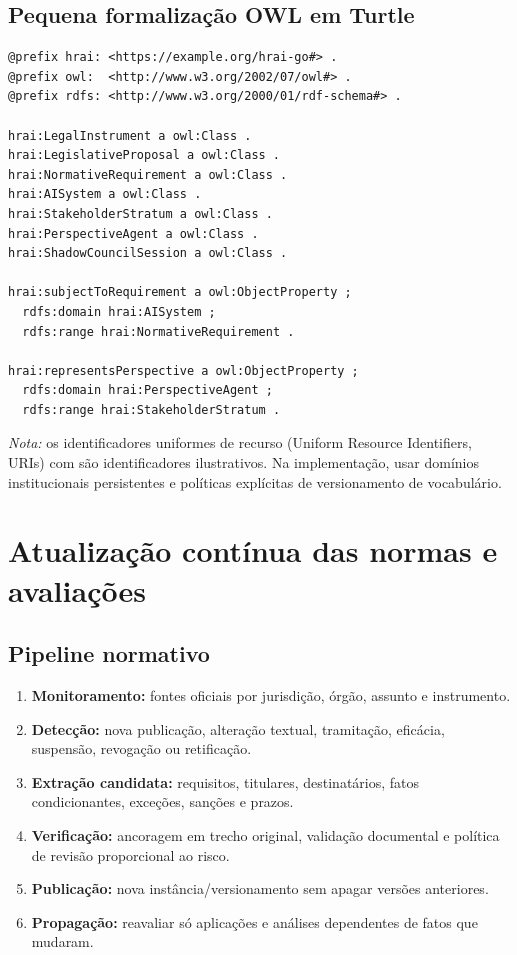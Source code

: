 \documentclass[12pt,a4paper,oneside,english,brazil]{abntex2}
\newcommand{\term}[1]{{\mdseries\ttfamily\small\seqsplit{#1}}}
\begin{document}
\section{Pequena formalização OWL em Turtle}
\begin{lstlisting}
@prefix hrai: <https://example.org/hrai-go#> .
@prefix owl:  <http://www.w3.org/2002/07/owl#> .
@prefix rdfs: <http://www.w3.org/2000/01/rdf-schema#> .

hrai:LegalInstrument a owl:Class .
hrai:LegislativeProposal a owl:Class .
hrai:NormativeRequirement a owl:Class .
hrai:AISystem a owl:Class .
hrai:StakeholderStratum a owl:Class .
hrai:PerspectiveAgent a owl:Class .
hrai:ShadowCouncilSession a owl:Class .

hrai:subjectToRequirement a owl:ObjectProperty ;
  rdfs:domain hrai:AISystem ;
  rdfs:range hrai:NormativeRequirement .

hrai:representsPerspective a owl:ObjectProperty ;
  rdfs:domain hrai:PerspectiveAgent ;
  rdfs:range hrai:StakeholderStratum .
\end{lstlisting}
\noindent\textit{Nota:} os identificadores uniformes de recurso (Uniform Resource Identifiers, URIs) com \term{example.org} são identificadores ilustrativos. Na implementação, usar domínios institucionais persistentes e políticas explícitas de versionamento de vocabulário.

\chapter{Atualização contínua das normas e avaliações}
\section{Pipeline normativo}
\begin{enumerate}
\item \textbf{Monitoramento:} fontes oficiais por jurisdição, órgão, assunto e instrumento.
\item \textbf{Detecção:} nova publicação, alteração textual, tramitação, eficácia, suspensão, revogação ou retificação.
\item \textbf{Extração candidata:} requisitos, titulares, destinatários, fatos condicionantes, exceções, sanções e prazos.
\item \textbf{Verificação:} ancoragem em trecho original, validação documental e política de revisão proporcional ao risco.
\item \textbf{Publicação:} nova instância/versionamento sem apagar versões anteriores.
\item \textbf{Propagação:} reavaliar só aplicações e análises dependentes de fatos que mudaram.
\end{enumerate}
\end{document}
